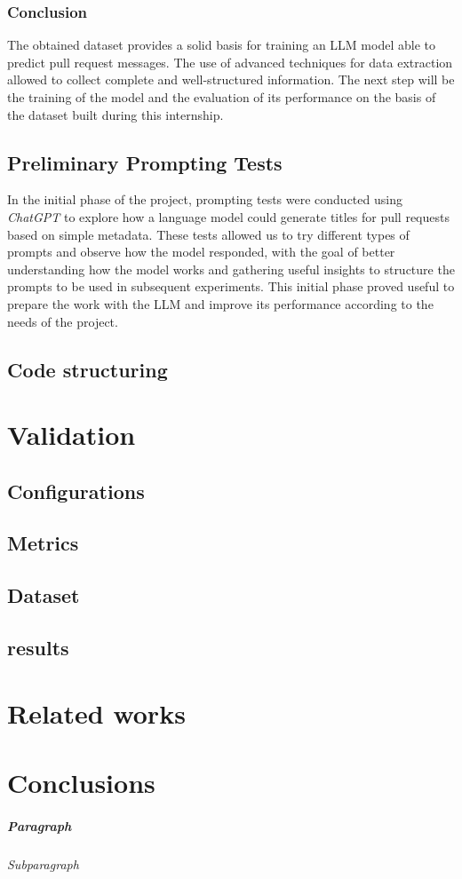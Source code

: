 \subsection{Conclusion}
The obtained dataset provides a solid basis for training an LLM model able to predict pull request messages. The use of advanced techniques for data extraction allowed to collect complete and well-structured information. The next step will be the training of the model and the evaluation of its performance on the basis of the dataset built during this internship.
\section{Preliminary Prompting Tests}
In the initial phase of the project, prompting tests were conducted using \textit{ChatGPT} to explore how a language model could generate titles for pull requests based on simple metadata. These tests allowed us to try different types of prompts and observe how the model responded, with the goal of better understanding how the model works and gathering useful insights to structure the prompts to be used in subsequent experiments. This initial phase proved useful to prepare the work with the LLM and improve its performance according to the needs of the project.
\section{Code structuring}

\chapter{Validation}
\section{Configurations}
\section{Metrics}
\section{Dataset}
\section{results}
\chapter{Related works}
\chapter{Conclusions}


\paragraph{Paragraph}
\subparagraph{Subparagraph}